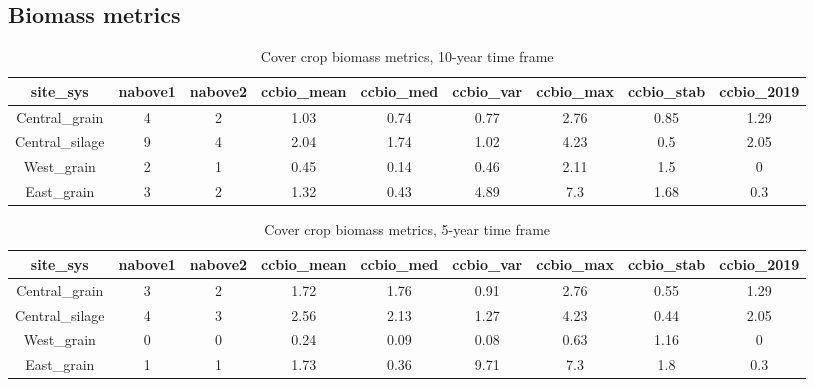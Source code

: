 \documentclass[]{article}
\begin{document}
\hypertarget{biomass-metrics}{%
\subsection{Biomass metrics}\label{biomass-metrics}}

\begin{table}[H]

\caption{\label{tab:ccbio10yr}Cover crop biomass metrics, 10-year time frame}
\centering
\begin{tabular}[t]{ccccccccc}
\toprule
site\_sys & nabove1 & nabove2 & ccbio\_mean & ccbio\_med & ccbio\_var & ccbio\_max & ccbio\_stab & ccbio\_2019\\
\midrule
\rowcolor{gray!6}  Central\_grain & 4 & 2 & 1.03 & 0.74 & 0.77 & 2.76 & 0.85 & 1.29\\
\cmidrule{1-9}
Central\_silage & 9 & 4 & 2.04 & 1.74 & 1.02 & 4.23 & 0.5 & 2.05\\
\cmidrule{1-9}
\rowcolor{gray!6}  West\_grain & 2 & 1 & 0.45 & 0.14 & 0.46 & 2.11 & 1.5 & 0\\
\cmidrule{1-9}
East\_grain & 3 & 2 & 1.32 & 0.43 & 4.89 & 7.3 & 1.68 & 0.3\\
\bottomrule
\end{tabular}
\end{table}

\begin{table}[H]

\caption{\label{tab:ccbio5yr}Cover crop biomass metrics, 5-year time frame}
\centering
\begin{tabular}[t]{ccccccccc}
\toprule
site\_sys & nabove1 & nabove2 & ccbio\_mean & ccbio\_med & ccbio\_var & ccbio\_max & ccbio\_stab & ccbio\_2019\\
\midrule
\rowcolor{gray!6}  Central\_grain & 3 & 2 & 1.72 & 1.76 & 0.91 & 2.76 & 0.55 & 1.29\\
\cmidrule{1-9}
Central\_silage & 4 & 3 & 2.56 & 2.13 & 1.27 & 4.23 & 0.44 & 2.05\\
\cmidrule{1-9}
\rowcolor{gray!6}  West\_grain & 0 & 0 & 0.24 & 0.09 & 0.08 & 0.63 & 1.16 & 0\\
\cmidrule{1-9}
East\_grain & 1 & 1 & 1.73 & 0.36 & 9.71 & 7.3 & 1.8 & 0.3\\
\bottomrule
\end{tabular}
\end{table}
\end{document}
